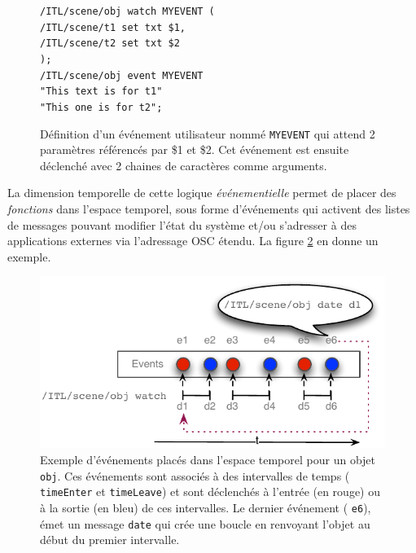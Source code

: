 \documentclass{article}
\newcommand{\OSC}[1]	{{\fontsize{9pt}{9pt} \selectfont\texttt{#1}}}
\newcommand{\tab}{\hspace*{4mm}}
\newcommand{\sample}[1]		{\vspace{-0.2em}\begin{center}\colorbox{mygrey}{\begin{minipage}[t]{0.98\columnwidth} {\small \texttt{#1}}\end{minipage}}\end{center}}
\begin{document}
\begin{figure}[h]
   \centering
   \sample{/ITL/scene/obj watch MYEVENT ( \\
\tab/ITL/scene/t1 set txt \$1, \\
\tab/ITL/scene/t2 set txt \$2 \\
);   \\   
/ITL/scene/obj event MYEVENT \\
\hspace*{25mm}"This text is for t1"\\
\hspace*{25mm}"This one is for t2"; 
}
   \caption{Définition d'un événement utilisateur nommé \OSC{MYEVENT} qui attend 2 paramètres référencés par \$1 et \$2. Cet événement est ensuite déclenché avec 2 chaines de caractères comme arguments.}
   \label{fig:uevent}
\end{figure}


La dimension temporelle de cette logique \emph{événementielle} permet de placer des \emph{fonctions} dans l'espace temporel, sous forme d'événements qui activent des listes de messages pouvant modifier l'état du système et/ou s'adresser à des applications externes via l'adressage OSC étendu. La figure \ref{fig:events} en donne un exemple.
  
\begin{figure}[h]
   \centering
   \includegraphics[width=0.95\columnwidth]{imgs/events}
   \caption{Exemple d'événements placés dans l'espace temporel pour un objet \OSC{obj}. Ces événements sont associés à des intervalles de temps (\OSC{timeEnter} et \OSC{timeLeave}) et sont déclenchés à l'entrée (en rouge) ou à la sortie (en bleu) de ces intervalles. Le dernier événement (\OSC{e6}), émet un message \OSC{date} qui crée une boucle en renvoyant l'objet au début du premier intervalle.}
   \label{fig:events}
\end{figure}

\end{document}
